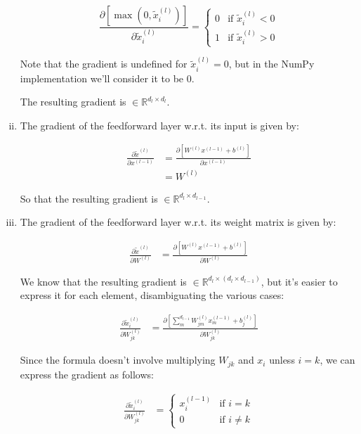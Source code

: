 \documentclass{article}
\begin{document}
\begin{enumerate}[i.]
  \begin{equation*}
    \frac{\partial \left[ \max(0, \tilde{x}_i^{(l)}) \right]}{\partial \tilde{x}_i^{(l)}} =
    \begin{cases}
      0 & \text{if } \tilde{x}_i^{(l)} < 0 \\
      1 & \text{if } \tilde{x}_i^{(l)} > 0
    \end{cases}
  \end{equation*}

  Note that the gradient is undefined for $\tilde{x}_i^{(l)} = 0$, but in the NumPy implementation we'll consider it to be $0$.

  The resulting gradient is $\in \mathbb{R}^{d_l \times d_l}$.

  \item The gradient of the feedforward layer w.r.t. its input is given by:

  \begin{align*}
    \frac{\partial \tilde{x}^{(l)}}{\partial x^{(l-1)}} &= \frac{\partial \left[ W^{(l)} x^{(l-1)} + b^{(l)} \right]}{\partial x^{(l-1)}} \\
    &= W^{(l)}
  \end{align*}

  So that the resulting gradient is $\in \mathbb{R}^{d_l \times d_{l-1}}$.

  \item The gradient of the feedforward layer w.r.t. its weight matrix is given by:

  \begin{align*}
    \frac{\partial \tilde{x}^{(l)}}{\partial W^{(l)}} &= \frac{\partial \left[ W^{(l)} x^{(l-1)} + b^{(l)} \right]}{\partial W^{(l)}}
  \end{align*}

  We know that the resulting gradient is $\in \mathbb{R}^{d_l \times (d_l \times d_{l-1})}$, but it's easier to express it for each element, disambiguating the various cases:

  \begin{align*}
    \frac{\partial \tilde{x}_i^{(l)}}{\partial W_{jk}^{(l)}} &= \frac{\partial \left[ \sum_m^{d_{l-1}} W_{jm}^{(l)} x_m^{(l-1)} + b_j^{(l)} \right]}{\partial W_{jk}^{(l)}}
  \end{align*}

  Since the formula doesn't involve multiplying $W_{jk}$ and $x_{i}$ unless $i = k$, we can express the gradient as follows:

  \begin{align*}
    \frac{\partial \tilde{x}_i^{(l)}}{\partial W_{jk}^{(l)}} &=
    \begin{cases}
      x_i^{(l-1)} & \text{if } i = k \\
      0 & \text{if } i \neq k
    \end{cases}
  \end{align*}


\end{enumerate}
\end{document}
